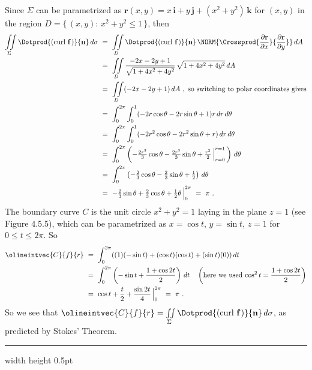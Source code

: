 \begin{exa}
 \par\noindent
 Since $\Sigma$ can be parametrized as $\textbf{r}(x,y) = x\,\textbf{i}+y\,\textbf{j}+(x^2 + y^2 )\,\textbf{k}$ for
 $(x,y)$ in the region $D = \lbrace \, (x,y):\,x^2 + y^2 \le 1 \,\rbrace$, then
 \begin{align*}
  \iint\limits_{\Sigma} \Dotprod{(\text{curl}~{\textbf{f}}\,)}{\textbf{n}}\,d\sigma ~&=~
   \iint\limits_{D} \Dotprod{(\text{curl}~{\textbf{f}}\,)}{\textbf{n}}\,
   \NORM{\Crossprod{\frac{\partial \textbf{r}}{\partial x}}{\frac{\partial \textbf{r}}{\partial y}}}\,dA\\
   &=~ \iint\limits_{D} \frac{-2x-2y+1}{\sqrt{1 + 4x^2 + 4y^2}}\,\sqrt{1 + 4x^2 + 4y^2}\,dA\\
   &=~ \iint\limits_{D} (-2x-2y+1)\,dA ~,~\text{so switching to polar coordinates gives}\\
   &=~ \int_0^{2\pi} \int_0^1 (-2r\cos \theta - 2r\sin \theta + 1)r\,dr\,d\theta\\
   &=~ \int_0^{2\pi} \int_0^1 (-2r^2 \cos \theta - 2r^2 \sin \theta + r)\,dr\,d\theta\\
   &=~ \int_0^{2\pi} \left( -\tfrac{2r^3}{3} \cos \theta - \tfrac{2r^3}{3} \sin \theta +
   \tfrac{r^2}{2}\,\Big|_{r=0}^{r=1} \,\right)\,d\theta\\
   &=~ \int_0^{2\pi} \left( -\tfrac{2}{3} \cos \theta - \tfrac{2}{3} \sin \theta + \tfrac{1}{2} \right)\,d\theta\\
   &=~ -\tfrac{2}{3} \sin \theta + \tfrac{2}{3} \cos \theta + \tfrac{1}{2}\theta\,\Big|_0^{2\pi} ~=~ \pi ~.
 \end{align*}
 The boundary curve $C$ is the unit circle $x^2 + y^2 =1$ laying in the plane $z=1$ (see Figure 4.5.5), which can be
 parametrized as $x = \cos t$, $y = \sin t$, $z = 1$ for $0 \le t \le 2\pi$. So
 \begin{align*}
  \olineintvec{C}{f}{r} ~&=~ \int_0^{2\pi} ((1)(-\sin t) + (\cos t)(\cos t) + (\sin t)(0))\,dt\\
   &=~ \int_0^{2\pi} \left( -\sin t + \frac{1+\cos 2t}{2} \right) \,dt \quad \left( \text{here we used $\cos^2 t =
   \frac{1+\cos 2t}{2}$} \right)\\
   &=~ \cos t + \frac{t}{2} + \frac{\sin 2t}{4}\,\Big|_0^{2\pi} ~=~ \pi ~.
 \end{align*}
 So we see that $\olineintvec{C}{f}{r}=\iint\limits_{\Sigma} \Dotprod{(\text{curl}~{\textbf{f}}\,)}{\textbf{n}}
 \,d\sigma$, as predicted by Stokes' Theorem.
\end{exa}
\hrule width \textwidth height 0.5pt
\vspace{3mm}

